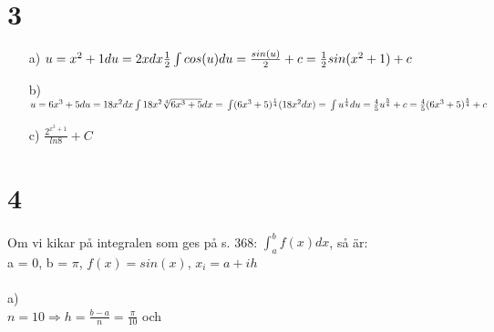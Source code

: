 \documentclass{article}
\begin{document}
\section*{3}
\begin{itemize}
    \item[a) ] $u = x^2+1 \\
                du = 2xdx \\
                \frac{1}{2} \int cos(u) du = \\
                \frac{sin(u)}{2} + c = \\
                \frac{1}{2} sin(x^2+1) + c$ 
    \item[b) ] $u = 6x^3 + 5 \\
                du = 18x^2dx \\
                \int 18x^2 \sqrt[4]{6x^3+5}dx = \\ 
                \int (6x^3+5)^{\frac{1}{4}}(18x^2dx) = \\
                \int u^{\frac{1}{4}}du = \\
                \frac{4}{5} u^{\frac{5}{4}}+c = \\
                \frac{4}{5}(6x^3+5)^{\frac{5}{4}}+c$ 
    \item[c) ] $\frac{2^{x^3+1}}{ln 8} + C$ 
\end{itemize}



\section*{4}
Om vi kikar på integralen som ges på s. 368: $\int_a^b f(x) dx$, så är: \\
a = 0, b = $\pi$, $f(x) = sin(x)$, $x_i = a+ih$\\\\

\noindent
a) \\
\noindent
$n = 10 \Rightarrow h = \frac{b-a}{n} = \frac{\pi}{10}$ och 
\end{document}
